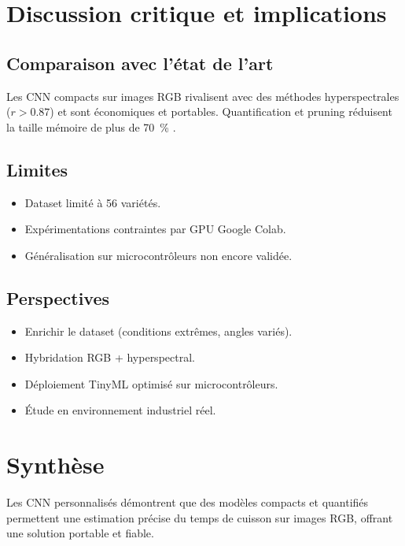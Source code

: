 \section{Discussion critique et implications}
\subsection{Comparaison avec l’état de l’art}
Les CNN compacts sur images RGB rivalisent avec des méthodes hyperspectrales ($r>0.87$) \citep{mendoza2018} et sont économiques et portables. Quantification et pruning réduisent la taille mémoire de plus de 70~\% \citep{jacob2018quantization, han2016deep}.

\subsection{Limites}
\begin{itemize}
    \item Dataset limité à 56 variétés.  
    \item Expérimentations contraintes par GPU Google Colab.  
    \item Généralisation sur microcontrôleurs non encore validée.
\end{itemize}

\subsection{Perspectives}
\begin{itemize}
    \item Enrichir le dataset (conditions extrêmes, angles variés).  
    \item Hybridation RGB + hyperspectral.  
    \item Déploiement TinyML optimisé sur microcontrôleurs.  
    \item Étude en environnement industriel réel.
\end{itemize}

\section{Synthèse}
Les CNN personnalisés démontrent que des modèles compacts et quantifiés permettent une estimation précise du temps de cuisson sur images RGB, offrant une solution portable et fiable.
